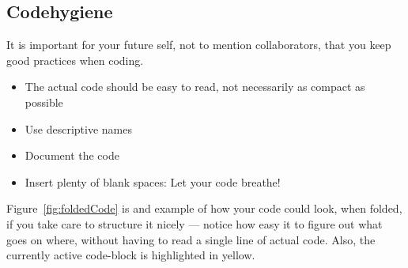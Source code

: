 \subsection{Codehygiene}
It is important for your future self, not to mention collaborators, that you keep good practices when coding.

\begin{itemize}
\item The actual code should be easy to read, not necessarily as compact as possible
\item Use descriptive names
\item Document the code
\item Insert plenty of blank spaces: Let your code breathe!
\end{itemize}

Figure~\ref{fig:foldedCode} is and example of how your code could look, when folded, if you take care to structure it nicely --- notice how easy it to figure out what goes on where, without having to read a single line of actual code. Also, the currently active code-block is highlighted in yellow.